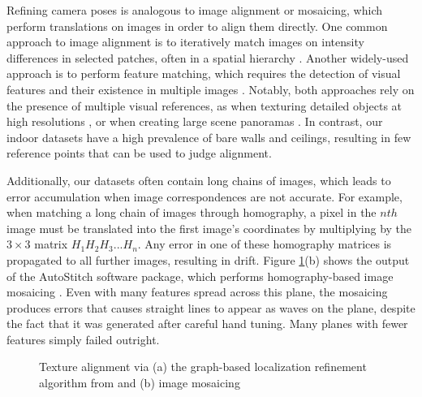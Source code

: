 \documentclass[10pt,twocolumn,letterpaper]{article}
\begin{document}
Refining camera poses is analogous to image alignment or mosaicing,
which perform translations on images in order to align them directly.
One common approach to image alignment is to iteratively match images
on intensity differences in selected patches, often in a spatial
hierarchy \cite{hager1998efficient, lucas1981iterative,
  shum2000systems, szeliski2006image}. Another widely-used approach is
to perform feature matching, which requires the detection of visual
features and their existence in multiple images
\cite{brown2007automatic, cho2003automatic,
  mikolajczyk2005performance, szeliski2006image,
  yun2003comprehensive}. Notably, both approaches rely on the presence
of multiple visual references, as when texturing detailed objects at
high resolutions \cite{bernardinimultiplescans, wangmultipleviews}, or
when creating large scene panoramas \cite{agarwalapanoramas,
  bernardinimultiplescans, debevecviewdependent,
  snavelyphototourism}. In contrast, our indoor datasets have a high
prevalence of bare walls and ceilings, resulting in few reference
points that can be used to judge alignment.

Additionally, our datasets often contain long chains of images, which
leads to error accumulation when image correspondences are not
accurate. For example, when matching a long chain of images through
homography, a pixel in the $nth$ image must be translated into the
first image's coordinates by multiplying by the $3\times3$ matrix $H_1
H_2 H_3 ... H_n$. Any error in one of these homography matrices is
propagated to all further images, resulting in drift. Figure
\ref{fig:mosaic3D}(b) shows the output of the AutoStitch software
package, which performs homography-based image mosaicing
\cite{autostitch}. Even with many features spread across this plane,
the mosaicing produces errors that causes straight lines to appear as
waves on the plane, despite the fact that it was generated after
careful hand tuning. Many planes with fewer features simply failed
outright.

\begin{figure}
  \centering

  \centering {}
  \caption{Texture alignment via (a) the graph-based localization
    refinement algorithm from \cite{chen2010indoor} and (b) image
    mosaicing}
  \label{fig:mosaic3D}
\end{figure}
\end{document}
